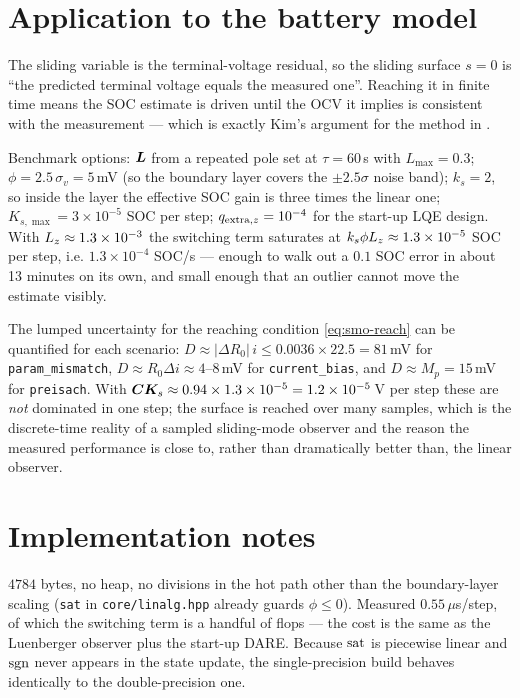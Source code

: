 \section{Application to the battery model}
The sliding variable is the terminal-voltage residual, so the sliding surface
$s = 0$ is ``the predicted terminal voltage equals the measured one''.  Reaching it in finite
time means the SOC estimate is driven until the OCV it implies is consistent with the
measurement --- which is exactly Kim's argument for the method in \cite{kim2006smo}.

Benchmark options: $\bm{L}$ from a repeated pole set at $\tau = 60$\,s with $L_{\max}=0.3$;
$\phi = 2.5\,\sigma_v = 5$\,mV (so the boundary layer covers the $\pm2.5\sigma$ noise band);
$k_s = 2$, so inside the layer the effective SOC gain is three times the linear one;
$K_{s,\max}=3\times10^{-5}$ SOC per step; $q_{\text{extra},z}=10^{-4}$ for the start-up LQE
design.  With $L_{z}\approx1.3\times10^{-3}$ the switching term saturates at
$k_s\phi L_{z}\approx1.3\times10^{-5}$ SOC per step, i.e. $1.3\times10^{-4}$ SOC/s ---
enough to walk out a $0.1$ SOC error in about 13 minutes on its own, and small enough that an
outlier cannot move the estimate visibly.

The lumped uncertainty for the reaching condition \eqref{eq:smo-reach} can be quantified for each
scenario: $D \approx |\Delta R_0|\,i \le 0.0036\times22.5 = 81$\,mV for
\texttt{param\_mismatch}, $D\approx R_0\Delta i \approx 4$--$8$\,mV for \texttt{current\_bias},
and $D\approx M_p = 15$\,mV for \texttt{preisach}.  With $\bm{C}\bm{K}_s \approx
0.94\times1.3\times10^{-5} = 1.2\times10^{-5}$\,V per step these are \emph{not} dominated in one
step; the surface is reached over many samples, which is the discrete-time reality of a sampled
sliding-mode observer and the reason the measured performance is close to, rather than
dramatically better than, the linear observer.

\section{Implementation notes}
$4784$ bytes, no heap, no divisions in the hot path other than the boundary-layer scaling
(\texttt{sat} in \texttt{core/linalg.hpp} already guards $\phi\le0$).  Measured $0.55\,\mu$s/step,
of which the switching term is a handful of flops --- the cost is the same as the Luenberger
observer plus the start-up DARE.  Because $\operatorname{sat}$ is piecewise linear and $\operatorname{sgn}$ never appears in
the state update, the single-precision build behaves identically to the double-precision one.

